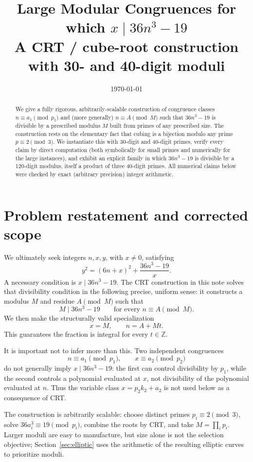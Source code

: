 \documentclass[11pt]{article}
\title{Large Modular Congruences for which $x \mid 36n^3-19$\\
\large A CRT / cube-root construction with 30- and 40-digit moduli}
\author{}
\date{\today}
\begin{document}
\maketitle

\begin{abstract}
We give a fully rigorous, arbitrarily-scalable construction of congruence classes
$n \equiv a_1 \pmod{p_1}$ and (more generally) $n\equiv A \pmod M$ such that
$36n^3-19$ is divisible by a prescribed modulus $M$ built from primes
of any prescribed size. The construction rests on the elementary fact that cubing
is a bijection modulo any prime $p\equiv 2\pmod 3$. We instantiate this with
30-digit and 40-digit primes, verify every claim by direct computation (both
symbolically for small primes and numerically for the large instances), and
exhibit an explicit family in which $36n^3-19$ is divisible by a
120-digit modulus, itself a product of three 40-digit primes. All numerical
claims below were checked by exact (arbitrary precision) integer arithmetic.
\end{abstract}

\section{Problem restatement and corrected scope}

We ultimately seek integers \(n,x,y\), with \(x\ne0\), satisfying
\[
  y^2=(6n+x)^2+\frac{36n^3-19}{x}.
\]
A necessary condition is \(x\mid36n^3-19\).  The CRT construction in this
note solves that divisibility condition in the following precise, uniform
sense: it constructs a modulus \(M\) and residue \(A\pmod M\) such that
\[
  M\mid36n^3-19\qquad\text{for every }n\equiv A\pmod M.
\]
We then make the structurally valid specialization
\[
  x=M,\qquad n=A+Mt.
\]
This guarantees the fraction is integral for every \(t\in\mathbb Z\).

It is important not to infer more than this.  Two independent congruences
\[
  n\equiv a_1\pmod{p_1},\qquad x\equiv a_2\pmod{p_2}
\]
do not generally imply \(x\mid36n^3-19\): the first can control divisibility
by \(p_1\), while the second controls a polynomial evaluated at \(x\), not
divisibility of the polynomial evaluated at \(n\).  Thus the variable class
\(x=p_2k_2+a_2\) is not used below as a consequence of CRT.

The construction is arbitrarily scalable: choose distinct primes
\(p_i\equiv2\pmod3\), solve \(36a_i^3\equiv19\pmod{p_i}\), combine the roots
by CRT, and take \(M=\prod_i p_i\).  Larger moduli are easy to manufacture,
but size alone is not the selection objective; Section~\ref{sec:elliptic}
uses the arithmetic of the resulting elliptic curves to prioritize moduli.
\end{document}
